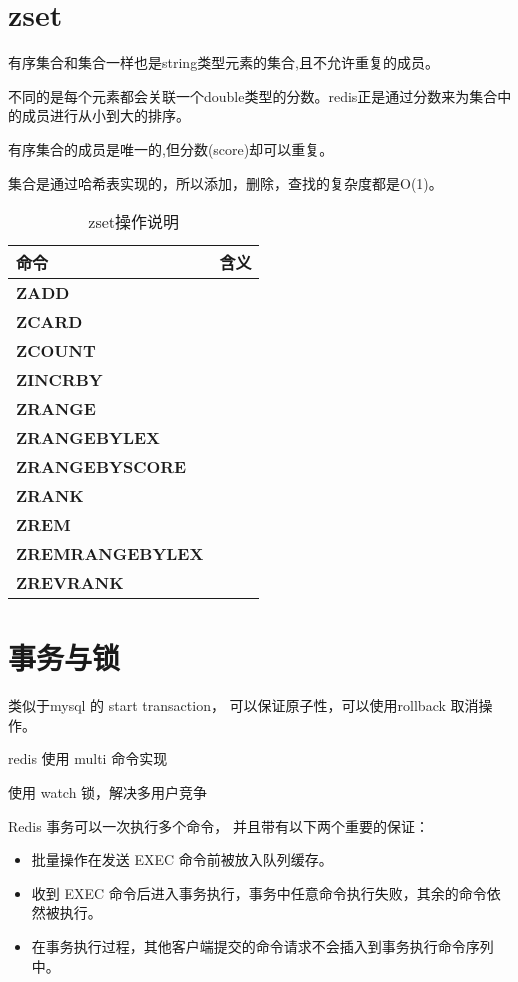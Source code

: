 \documentclass[UTF8,a4paper,12pt]{ctexbook}
\begin{document}
	\section{zset}
		有序集合和集合一样也是string类型元素的集合,且不允许重复的成员。
		
		不同的是每个元素都会关联一个double类型的分数。redis正是通过分数来为集合中的成员进行从小到大的排序。
		
		有序集合的成员是唯一的,但分数(score)却可以重复。
		
		集合是通过哈希表实现的，所以添加，删除，查找的复杂度都是O(1)。
		\begin{table}[H]
			\centering
			\caption{zset操作说明}
			\begin{tabular}{p{5cm}<{\centering} | p{11cm}<{\centering}}
				\toprule
					命令 &  含义 \\
				\midrule
				\textbf{ZADD}    &  	\\
				\textbf{ZCARD}   & 		\\
				\textbf{ZCOUNT}	 &		\\
				\textbf{ZINCRBY} &		\\
				\textbf{ZRANGE}	 &		\\
				\textbf{ZRANGEBYLEX}   &		\\
				\textbf{ZRANGEBYSCORE} & 		\\
				\textbf{ZRANK}  & 		\\
				\textbf{ZREM} 	& 		\\
				\textbf{ZREMRANGEBYLEX} &		\\
				\textbf{ZREVRANK} 	    & 		\\
				\bottomrule
			\end{tabular}
		\end{table}

	\section{事务与锁}
		类似于mysql 的 start transaction， 可以保证原子性，可以使用rollback 取消操作。
		
		redis 使用 multi  命令实现
		
		使用 watch 锁，解决多用户竞争
		
		Redis 事务可以一次执行多个命令， 并且带有以下两个重要的保证：
			\begin{itemize}[itemindent = 2em]
				\item 批量操作在发送 EXEC 命令前被放入队列缓存。
				\item 收到 EXEC 命令后进入事务执行，事务中任意命令执行失败，其余的命令依然被执行。
				\item 在事务执行过程，其他客户端提交的命令请求不会插入到事务执行命令序列中。
			\end{itemize}
		
\end{document}
